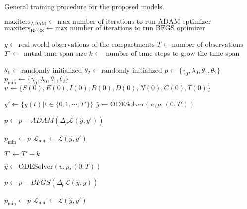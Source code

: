 \begin{algorithm}
    \caption{General training procedure for the proposed models.}
    \label{alg:seir-ude-training}
    \begin{algorithmic}
        \State $\text{maxiters}_\text{ADAM} \gets \text{max number of iterations to run ADAM optimizer}$
        \State $\text{maxiters}_\text{BFGS} \gets \text{max number of iterations to run BFGS optimizer}$

        \State $y \gets \text{real-world observations of the compartments}$
        \State $T \gets \text{number of observations}$
        \State $T' \gets$ initial time span size
        \State $k \gets$ number of time steps to grow the time span

        \State $\theta_1 \gets \text{randomly initialized}$
        \State $\theta_2 \gets \text{randomly initialized}$
        \State $p \gets \{ \gamma_0, \lambda_0, \theta_1, \theta_2 \}$
        \State $p_\text{min} \gets \{ \gamma_0, \lambda_0, \theta_1, \theta_2 \}$
        \State $u \gets \{ S(0), E(0), I(0), R(0), D(0), N(0), C(0), T(0) \}$

            \State $y' \gets \{ y(t) | t \in \{ 0,1,\cdots,T' \} \}$
                \State $\hat{y} \gets \text{ODESolver}(u, p, (0, T'))$

                \State $p \gets p - ADAM(\Delta_p \mathcal{L}(\hat{y}, y'))$

                    \State $p_\text{min} \gets p$
                    \State $\mathcal{L}_\text{min} \gets \mathcal{L}(\hat{y}, y')$
                \EndIf
            \EndFor

            \State $T' \gets T' + k$
        \EndWhile

            \State $\hat{y} \gets \text{ODESolver}(u, p, (0, T))$

            \State $p \gets p - BFGS(\Delta_p \mathcal{L}(\hat{y}, y))$

                \State $p_\text{min} \gets p$
                \State $\mathcal{L}_\text{min} \gets \mathcal{L}(\hat{y}, y')$
            \EndIf
        \EndFor
    \end{algorithmic}
\end{algorithm}